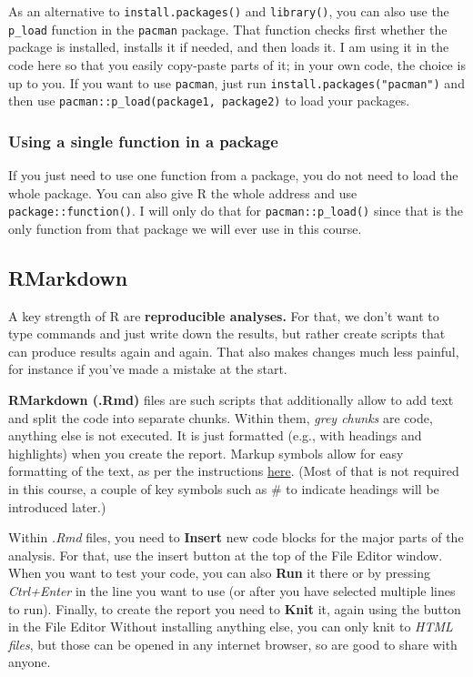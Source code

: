 \documentclass[
]{book}
\begin{document}
As an alternative to \texttt{install.packages()} and \texttt{library()}, you can also use the \texttt{p\_load} function in the \texttt{pacman} package. That function checks first whether the package is installed, installs it if needed, and then loads it. I am using it in the code here so that you easily copy-paste parts of it; in your own code, the choice is up to you. If you want to use \texttt{pacman}, just run \texttt{install.packages("pacman")} and then use \texttt{pacman::p\_load(package1,\ package2)} to load your packages.

\hypertarget{using-a-single-function-in-a-package}{%
\subsubsection{Using a single function in a package}\label{using-a-single-function-in-a-package}}

If you just need to use one function from a package, you do not need to load the whole package. You can also give R the whole address and use \texttt{package::function()}. I will only do that for \texttt{pacman::p\_load()} since that is the only function from that package we will ever use in this course.

\hypertarget{rmarkdown}{%
\subsection{RMarkdown}\label{rmarkdown}}

A key strength of R are \textbf{reproducible analyses.} For that, we don't want to type commands and just write down the results, but rather create scripts that can produce results again and again. That also makes changes much less painful, for instance if you've made a mistake at the start.

\textbf{RMarkdown (.Rmd)} files are such scripts that additionally allow to add text and split the code into separate chunks. Within them, \emph{grey chunks} are code, anything else is not executed. It is just formatted (e.g., with headings and highlights) when you create the report. Markup symbols allow for easy formatting of the text, as per the instructions \href{https://rmarkdown.rstudio.com/authoring_basics.html}{here}. (Most of that is not required in this course, a couple of key symbols such as \# to indicate headings will be introduced later.)

Within \emph{.Rmd} files, you need to \textbf{Insert} new code blocks for the major parts of the analysis. For that, use the insert button at the top of the File Editor window. When you want to test your code, you can also \textbf{Run} it there or by pressing \emph{Ctrl+Enter} in the line you want to use (or after you have selected multiple lines to run). Finally, to create the report you need to \textbf{Knit} it, again using the button in the File Editor Without installing anything else, you can only knit to \emph{HTML files}, but those can be opened in any internet browser, so are good to share with anyone.
\end{document}
